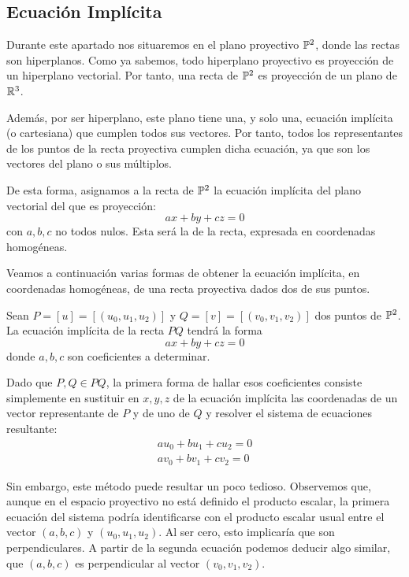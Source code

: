 \subsection{Ecuación Implícita}\label{C3_subsec_eq_param_recta}

Durante este apartado nos situaremos en el plano proyectivo $\mathbb{P}^2$, donde las rectas son hiperplanos. Como ya sabemos, todo hiperplano proyectivo es proyección de un hiperplano vectorial. Por tanto, una recta de $\mathbb{P}^2$ es proyección de un plano de $\mathbb{R}^3$.

Además, por ser hiperplano, este plano tiene una, y solo una, ecuación implícita (o cartesiana) que cumplen todos sus vectores. Por tanto, todos los representantes de los puntos de la recta proyectiva cumplen dicha ecuación, ya que son los vectores del plano o sus múltiplos. 

De esta forma, asignamos a la recta de $\mathbb{P}^2$ la ecuación implícita del plano vectorial del que es proyección:
\begin{equation}
	\label{C3_eq_implicita_recta}
	ax+by+cz=0
\end{equation}
con $a,b,c$ no todos nulos. Esta será la  de la recta, expresada en coordenadas homogéneas.

Veamos a continuación varias formas de obtener la ecuación implícita, en coordenadas homogéneas, de una recta proyectiva dados dos de sus puntos.

Sean $P=[u]=[(u_0,u_1,u_2)]$ y $Q=[v]=[(v_0,v_1,v_2)]$ dos puntos de $\mathbb{P}^2$. La ecuación implícita de la recta $PQ$ tendrá la forma
\begin{equation*}
	ax+by+cz=0
\end{equation*}
donde $a,b,c$ son coeficientes a determinar.

Dado que $P,Q\in PQ$, la primera forma de hallar esos coeficientes consiste simplemente en sustituir en $x,y,z$ de la ecuación implícita las coordenadas de un vector representante de $P$ y de uno de $Q$ y resolver el sistema de ecuaciones resultante:
\begin{equation}
\label{C3_eq_implicitas_evaluadas}
	\begin{split}
		au_0+bu_1+cu_2=0\\
		av_0+bv_1+cv_2=0
	\end{split}
\end{equation}

Sin embargo, este método puede resultar un poco tedioso. Observemos que, aunque en el espacio proyectivo no está definido el producto escalar, la primera ecuación del sistema podría identificarse con el producto escalar usual entre el vector $(a,b,c)$ y $(u_0,u_1,u_2)$. Al ser cero, esto implicaría que son perpendiculares. A partir de la segunda ecuación podemos deducir algo similar, que $(a,b,c)$ es perpendicular al vector $(v_0,v_1,v_2)$.


